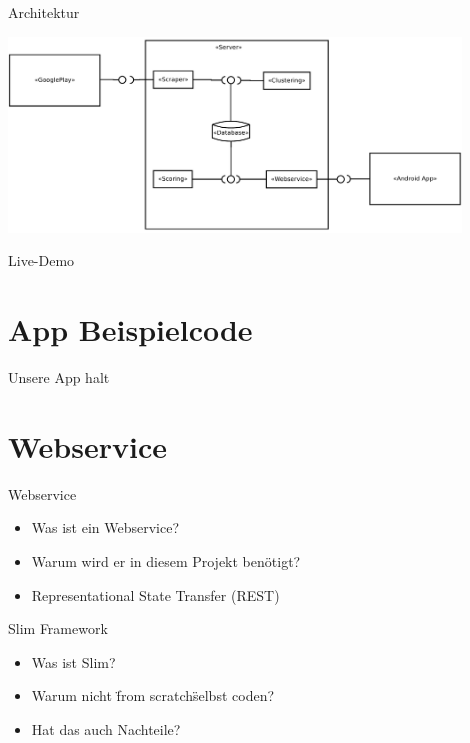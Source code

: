\documentclass[compress,t]{beamer}
\begin{document}
\begin{frame}{Architektur}

    \begin{center}
        \includegraphics[width=0.9\textwidth]{img/architecture.png}
    \end{center}

\end{frame}

\begin{frame}{Live-Demo}

\end{frame}

\section{App Beispielcode}

\begin{frame}
    Unsere App halt
\end{frame}

\section{Webservice}

\begin{frame}{Webservice}

    \begin{center}
        \begin{itemize}
            \item Was ist ein Webservice?
            \item Warum wird er in diesem Projekt benötigt?
            \item Representational State Transfer (REST)
        \end{itemize}
    \end{center}

\end{frame}

\begin {frame}{Slim Framework}

    \begin{center}
        \begin{itemize}
            \item Was ist Slim?
            \item Warum nicht \"from scratch\" selbst coden?
            \item Hat das auch Nachteile?
        \end{itemize}
    \end{center}

\end{frame}
\end{document}
